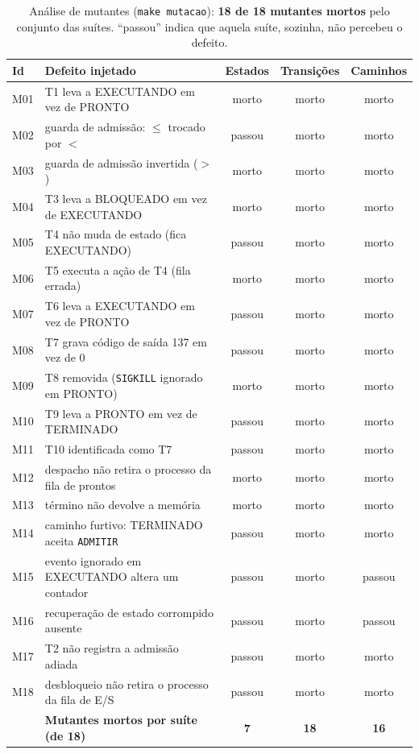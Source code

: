 \documentclass[11pt,a4paper]{article}
\theoremstyle{definition}
\newcommand{\est}[1]{\textsf{\small #1}}   %
\newcommand{\ev}[1]{\texttt{\small #1}}    %
\begin{document}
\begin{table}[H]
\centering\small
\setlength{\tabcolsep}{4pt}
\begin{tabularx}{\textwidth}{lLccc}
\toprule
Id & Defeito injetado & Estados & Transições & Caminhos \\
\midrule
M01 & T1 leva a \est{EXECUTANDO} em vez de \est{PRONTO} & morto & morto & morto \\
M02 & guarda de admissão: $\le$ trocado por $<$ & passou & morto & morto \\
M03 & guarda de admissão invertida ($>$) & morto & morto & morto \\
M04 & T3 leva a \est{BLOQUEADO} em vez de \est{EXECUTANDO} & morto & morto & morto \\
M05 & T4 não muda de estado (fica \est{EXECUTANDO}) & passou & morto & morto \\
M06 & T5 executa a ação de T4 (fila errada) & morto & morto & morto \\
M07 & T6 leva a \est{EXECUTANDO} em vez de \est{PRONTO} & passou & morto & morto \\
M08 & T7 grava código de saída 137 em vez de 0 & passou & morto & morto \\
M09 & T8 removida (\texttt{SIGKILL} ignorado em \est{PRONTO}) & morto & morto & morto \\
M10 & T9 leva a \est{PRONTO} em vez de \est{TERMINADO} & passou & morto & morto \\
M11 & T10 identificada como T7 & passou & morto & morto \\
M12 & despacho não retira o processo da fila de prontos & morto & morto & morto \\
M13 & término não devolve a memória & morto & morto & morto \\
M14 & caminho furtivo: \est{TERMINADO} aceita \ev{ADMITIR} & passou & morto & morto \\
M15 & evento ignorado em \est{EXECUTANDO} altera um contador & passou & morto & passou \\
M16 & recuperação de estado corrompido ausente & passou & morto & passou \\
M17 & T2 não registra a admissão adiada & passou & morto & morto \\
M18 & desbloqueio não retira o processo da fila de E/S & passou & morto & morto \\
\midrule
 & \textbf{Mutantes mortos por suíte (de 18)} & \textbf{7} & \textbf{18} & \textbf{16} \\
\bottomrule
\end{tabularx}
\caption{Análise de mutantes (\texttt{make mutacao}): \textbf{18 de 18 mutantes mortos} pelo conjunto
das suítes. ``passou'' indica que aquela suíte, sozinha, não percebeu o defeito.}
\label{tab:mutantes}
\end{table}
\end{document}
